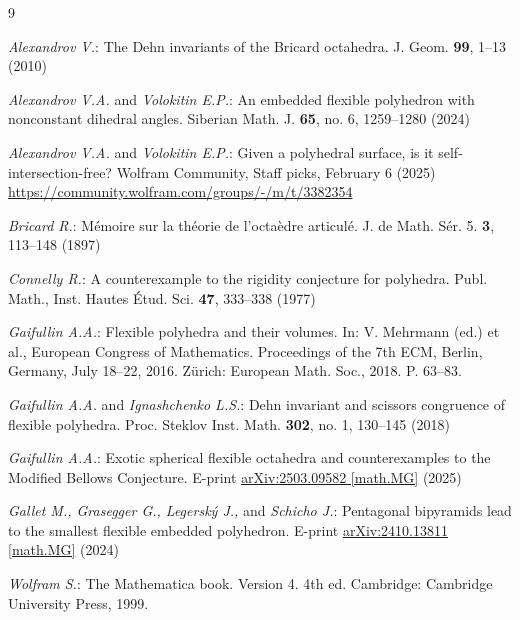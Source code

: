\documentclass[12pt, reqno]{amsart}
\begin{document}
\begin{thebibliography}{9}

{\sl Alexandrov V.}:
The Dehn invariants of the Bricard octahedra.
J. Geom. \textbf{99}, 1--13 (2010)

{\sl Alexandrov V.A.} and {\sl Volokitin E.P.}: 
An embedded flexible polyhedron with nonconstant dihedral angles.
Siberian Math. J. \textbf{65}, no. 6, 1259--1280 (2024)

{\sl Alexandrov V.A.} and {\sl Volokitin E.P.}: 
Given a polyhedral surface, is it self-intersection-free? 
Wolfram Community, Staff picks, February 6 (2025)
\href{https://community.wolfram.com/groups/-/m/t/3382354}{https://community.wolfram.com/groups/-/m/t/3382354}

{\sl Bricard R.}:
M{\'e}moire sur la th{\'e}orie de l'octa{\`e}dre articul{\'e}. 
J. de Math. S{\'e}r. 5. \textbf{3}, 113--148 (1897)

{\sl Connelly R.}:
A counterexample to the rigidity conjecture for polyhedra.
Publ. Math., Inst. Hautes \'Etud. Sci. \textbf{47}, 333--338 (1977)

{\sl Gaifullin A.A.}: Flexible polyhedra and their volumes.
In: V. Mehrmann (ed.) et al., European Congress of Mathematics. 
Proceedings of the 7th ECM, Berlin, Germany, July 18--22, 2016. 
Z\"urich: European Math. Soc., 2018. P. 63--83.

{\sl Gaifullin A.A.} and {\sl Ignashchenko L.S.}:
Dehn invariant and scissors congruence of flexible polyhedra. 
Proc. Steklov Inst. Math. \textbf{302}, no. 1, 130--145 (2018)

{\sl Gaifullin A.A.}:
Exotic spherical flexible octahedra and counterexamples to the Modified 
Bellows Conjecture.
E-print \href{https://arxiv.org/abs/2503.09582}{arXiv:2503.09582 [math.MG]} (2025)

{\sl Gallet M., Grasegger G., Legersk{\'y} J.,} and {\sl Schicho J.}:
Pentagonal bipyramids lead to the smallest flexible embedded polyhedron.
E-print \href{https://arxiv.org/abs/2410.13811}{arXiv:2410.13811 [math.MG]} (2024)

{\sl Wolfram S.}:
The Mathematica book. Version 4. 4th ed.  
Cambridge: Cambridge University Press, 1999.

\end{thebibliography}
\end{document}
